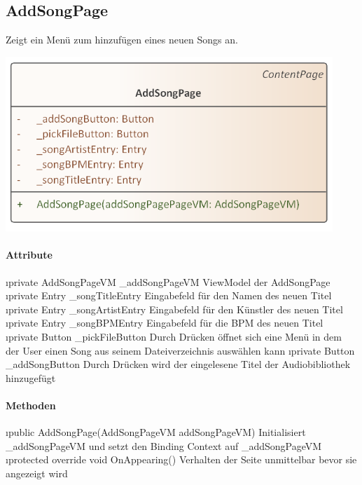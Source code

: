 \documentclass[../entwurf.tex]{subfiles}
\begin{document}
\subsection{AddSongPage}
Zeigt ein Menü zum hinzufügen eines neuen Songs an.  
\begin{center}
	\includegraphics[page=1,width=350pt,keepaspectratio]{../uml_klassen/View/AddSongPage.png}
\end{center}
\paragraph{Attribute}
\begin{itemize}
	\i{private AddSongPageVM \_addSongPageVM} ViewModel der AddSongPage
	\i{private Entry \_songTitleEntry} Eingabefeld für den Namen des neuen Titel
	\i{private Entry \_songArtistEntry} Eingabefeld für den Künstler des neuen Titel
	\i{private Entry \_songBPMEntry} Eingabefeld für die BPM des neuen Titel
	\i{private Button \_pickFileButton} Durch Drücken öffnet sich eine Menü in dem der User einen Song aus seinem Dateiverzeichnis auswählen kann
	\i{private Button \_addSongButton} Durch Drücken wird der eingelesene Titel der Audiobibliothek hinzugefügt
\end{itemize}

\paragraph{Methoden}
\begin{itemize}
	\i{public AddSongPage(AddSongPageVM addSongPageVM)} Initialisiert \_addSongPageVM und setzt den Binding Context 			auf \_addSongPageVM
	\i{protected override void OnAppearing()} Verhalten der Seite unmittelbar bevor sie angezeigt wird
\end{itemize}
\end{document}
